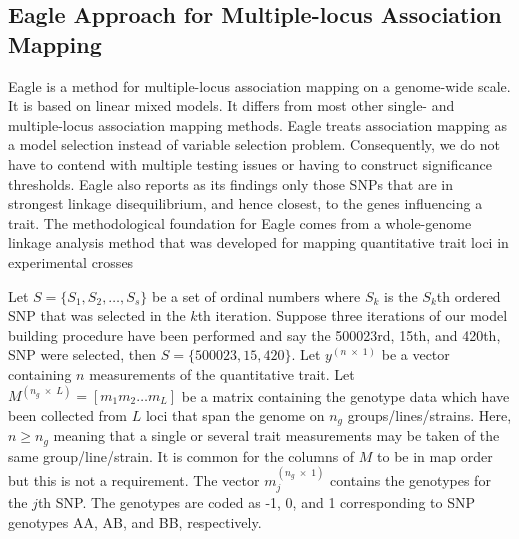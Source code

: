\documentclass{nature}
\begin{document}
\subsection{Eagle Approach for Multiple-locus Association Mapping}

Eagle is a method for multiple-locus association mapping on a genome-wide scale. It is based on linear mixed models. It differs from most other single- and multiple-locus association mapping methods. Eagle treats association mapping as a model selection instead of variable selection problem. Consequently,  we do not have to contend with multiple testing issues or having to construct significance thresholds.  
Eagle also 
reports as its findings only those SNPs that are in strongest linkage disequilibrium, and hence closest, to the genes influencing a trait. 
The methodological foundation for Eagle comes from a whole-genome linkage analysis method that was developed for mapping 
quantitative trait loci in experimental crosses \cite{verbyla2007analysis} 


Let $S = \{ S_1, S_2, \ldots, S_s\}$ be a set of ordinal numbers where $S_k$ is the $S_k$th ordered SNP that was 
selected in the $k$th iteration. Suppose three iterations of our model building procedure 
have been performed and say the 500023rd, 15th, and 420th, 
SNP were selected, then $S=\{500023, 15, 420\}$. 
Let $y^{(n \; \times \;1)}$ be a vector containing $n$ measurements of the quantitative trait. 
Let $M^{(n_g \; \times \; L)} = [m_1 m_2 \ldots m_L]$ be a matrix containing the genotype data which have been collected 
from $L$ loci that span the genome on $n_g$ groups/lines/strains.  Here, $n \geq n_g$ meaning that a single or several trait measurements 
may be taken of the same group/line/strain. 
 It is common for the columns of $M$ to be in map order but this is not a requirement. 
The vector $m_j^{(n_g \; \times \; 1)}$ contains the genotypes for the $j$th SNP. 
The genotypes are coded as -1, 0, and 1 corresponding to SNP genotypes AA, AB, and BB, respectively. 
\end{document}
